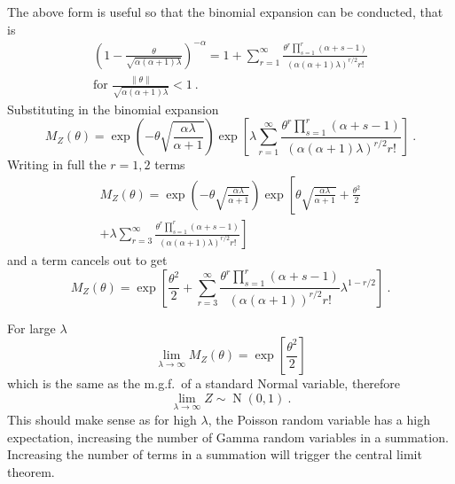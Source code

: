 \documentclass[12pt, a4paper]{memoir}
\DeclareMathOperator{\normal}{N}
\begin{document}
The above form is useful so that the binomial expansion can be conducted, that is
\begin{multline}
	\left(
		1-\frac{\theta}{\sqrt{\alpha(\alpha+1)\lambda}}
	\right)^{-\alpha}
	=
	1+
	\sum_{r=1}^\infty \frac{\theta^r\prod_{s=1}^r(\alpha+s-1)}{(\alpha(\alpha+1)\lambda)^{r/2}r!}
	\\
	\text{for }\frac{\|\theta\|}{\sqrt{\alpha(\alpha+1)\lambda}}<1 \ .
\end{multline}
Substituting in the binomial expansion
\begin{equation*}
	M_Z(\theta)=
	\exp\left(
	    -\theta\sqrt{\frac{\alpha\lambda}{\alpha+1}}
    \right)
	\exp\left[
		\lambda
		\sum_{r=1}^\infty \frac{\theta^r\prod_{s=1}^r(\alpha+s-1)}{(\alpha(\alpha+1)\lambda)^{r/2}r!}
	\right]
	\ .
\end{equation*}
Writing in full the $r=1,2$ terms
\begin{multline*}
	M_Z(\theta)=
	\exp\left(
	    -\theta\sqrt{\frac{\alpha\lambda}{\alpha+1}}
    \right)
	\exp\left[
		\theta\sqrt{\frac{\alpha\lambda}{\alpha+1}}
		+\frac{\theta^2}{2}
	\right.
	\\
	\left.
		+\lambda\sum_{r=3}^\infty \frac{\theta^r\prod_{s=1}^r(\alpha+s-1)}{(\alpha(\alpha+1)\lambda)^{r/2}r!}
	\right]
\end{multline*}
and a term cancels out to get
\begin{equation}
	M_Z(\theta)=
	\exp\left[
		\frac{\theta^2}{2}
		+\sum_{r=3}^\infty
		\frac
			{\theta^r\prod_{s=1}^r(\alpha+s-1)}
			{(\alpha(\alpha+1))^{r/2}r!}
		\lambda^{1-r/2}
	\right]
	\ .
\end{equation}

For large $\lambda$
\begin{equation}
	\lim_{\lambda\rightarrow\infty}M_Z(\theta)=\exp\left[\frac{\theta^2}{2}\right]
\end{equation}
which is the same as the m.g.f.~of a standard Normal variable, therefore
\begin{equation}
	\lim_{\lambda\rightarrow\infty}Z\sim\normal(0,1) \ .
\end{equation}
This should make sense as for high $\lambda$, the Poisson random variable has a high expectation, increasing the number of Gamma random variables in a summation. Increasing the number of terms in a summation will trigger the central limit theorem.
\end{document}
